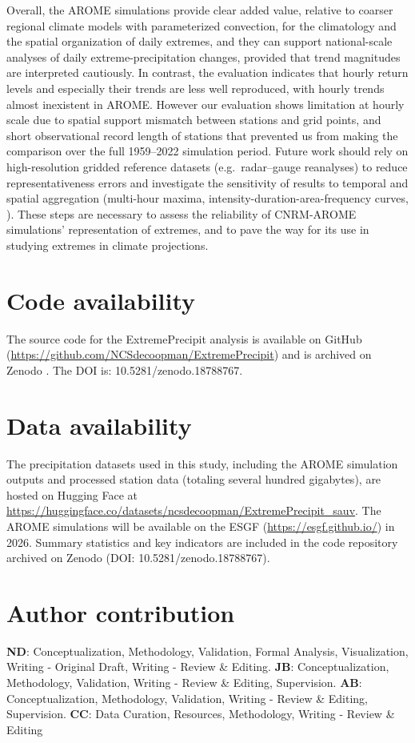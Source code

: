 \documentclass[hess, manuscript]{copernicus}
\begin{document}
Overall, the AROME simulations provide clear added value, relative to coarser regional climate models with parameterized convection, for the climatology and the spatial organization of daily extremes, and they can support national-scale analyses of daily extreme-precipitation changes, provided that trend magnitudes are interpreted cautiously. In contrast, the evaluation indicates that hourly return levels and especially their trends are less well reproduced, with hourly trends almost inexistent in AROME. However our evaluation shows limitation at hourly scale due to spatial support mismatch between stations and grid points, and short observational record length of stations that prevented us from making the comparison over the full 1959--2022 simulation period. Future work should rely on high-resolution gridded reference datasets (e.g.\ radar--gauge reanalyses) to reduce representativeness errors and investigate the sensitivity of results to temporal and spatial aggregation (multi-hour maxima, intensity-duration-area-frequency curves, \cite{haruna-etal-2024}). These steps are necessary to assess the reliability of CNRM-AROME simulations' representation of extremes, and to pave the way for its use in studying extremes in climate projections.

\section*{Code availability}
The source code for the ExtremePrecipit analysis is available on GitHub (\url{https://github.com/NCSdecoopman/ExtremePrecipit}) and is archived on Zenodo \citep{decoopman_zenodo_2026}. The DOI is: 10.5281/zenodo.18788767.

\section*{Data availability}
The precipitation datasets used in this study, including the AROME simulation outputs and processed station data (totaling several hundred gigabytes), are hosted on Hugging Face at \url{https://huggingface.co/datasets/ncsdecoopman/ExtremePrecipit_sauv}. The AROME simulations will be available on the ESGF (\url{https://esgf.github.io/}) in 2026. Summary statistics and key  indicators are included in the code repository archived on Zenodo (DOI: 10.5281/zenodo.18788767).

\section*{Author contribution}
\textbf{ND}: Conceptualization, Methodology, Validation, Formal Analysis, Visualization, Writing - Original Draft, Writing - Review \& Editing. \textbf{JB}: Conceptualization, Methodology, Validation, Writing - Review \& Editing, Supervision. \textbf{AB}: Conceptualization, Methodology, Validation, Writing - Review \& Editing, Supervision. \textbf{CC}: Data Curation, Resources, Methodology, Writing - Review \& Editing
\end{document}
